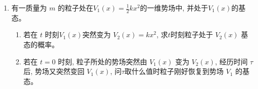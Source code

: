 \begin{enumerate}
{\begin{enumerate}
		由于 $\hat{B}$ 为厄米算符，$(e^{\hat{B}})^\dagger=e^{\hat{B}}$，故
		\[
			([\hat{A},e^{\hat{B}}])^\dagger=(Ce^{\hat{B}})^\dagger=C^*e^{\hat{B}}
		\]
		要使 $[\hat{A},e^{\hat{B}}]$ 为厄米算符，需 $([\hat{A},e^{\hat{B}}])^\dagger=[\hat{A},e^{\hat{B}}]$，即 $C^*=C$，所以 \textbf{$C$ 必须为实数}。
		
		\item 
		\begin{enumerate}
			\item $\hat{A}+i\hat{B}$：
			\[
				(\hat{A}+i\hat{B})^\dagger=\hat{A}^\dagger-i\hat{B}^\dagger=\hat{A}-i\hat{B}\neq\hat{A}+i\hat{B}
			\]
			一般不是厄米算符。
			
			\item $(\hat{A}+i\hat{B})(\hat{A}-i\hat{B})$：
			\[
				[(\hat{A}+i\hat{B})(\hat{A}-i\hat{B})]^\dagger=(\hat{A}-i\hat{B})^\dagger(\hat{A}+i\hat{B})^\dagger=(\hat{A}+i\hat{B})(\hat{A}-i\hat{B})
			\]
			是厄米算符。
			
			\item $(\hat{A}+\hat{B})^n$：
			因为 $(\hat{A}+\hat{B})^\dagger=\hat{A}+\hat{B}$，且对任意正整数 $n$ 有 $(\hat{H}^n)^\dagger=(\hat{H}^\dagger)^n$，故
			\[
				[(\hat{A}+\hat{B})^n]^\dagger=(\hat{A}+\hat{B})^n
			\]
			是厄米算符。
			
			\item $(\hat{A}+\hat{B})(\hat{A}-\hat{B})$：
			\[
				[(\hat{A}+\hat{B})(\hat{A}-\hat{B})]^\dagger=(\hat{A}-\hat{B})^\dagger(\hat{A}+\hat{B})^\dagger=(\hat{A}-\hat{B})(\hat{A}+\hat{B})
			\]
			而
			\[
				(\hat{A}+\hat{B})(\hat{A}-\hat{B})=\hat{A}^2-\hat{B}^2+[\hat{B},\hat{A}],\qquad
				(\hat{A}-\hat{B})(\hat{A}+\hat{B})=\hat{A}^2-\hat{B}^2+[\hat{A},\hat{B}]
			\]
			两者相等当且仅当 $[\hat{A},\hat{B}]=0$。故 \textbf{当且仅当 $[\hat{A},\hat{B}]=0$ 时为厄米算符}，一般情况下不是。
		\end{enumerate}
	\end{enumerate}
}


\item
有一质量为 $m$ 的粒子处在$V_{1}(x)=\frac{1}{2} k x^{2}$的一维势场中, 并处于$ V_{1}(x) $的基态。
\begin{enumerate}
	\item
	若在 $t$ 时刻$ V_{1}(x) $突然变为 $V_{2}(x)=k x^{2}$, 求$ t $时刻粒子处于 $V_{2}(x)$ 基态的概率。
	\item 
	 若在 $t=0$ 时刻, 粒子所处的势场突然由 $V_{1}(x)$ 变为 $V_{2}(x)$, 经历时间 $\tau$ 后, 势场又突然变回 $V_{1}(x)$, 问$ \tau $取什么值时粒子刚好恢复到势场 $V_{1}$ 的基态。
	

\end{enumerate}
\end{enumerate}
